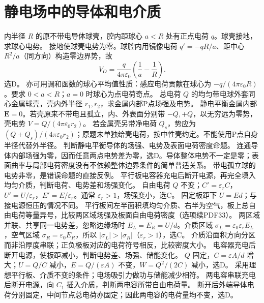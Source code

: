 \section{静电场中的导体和电介质}
\problemtext 内半径 $R$ 的原不带电导体球壳，腔内距球心 $a<R$ 处有正点电荷 $q$。球壳接地，求球心电势。
\workings 接地使球壳电势为零。球腔内用镜像电荷 $q'=-qR/a$、距中心 $R^2/a$（同方向）构造零边界势，故
\[
V_O=\frac{q}{4\pi\varepsilon_0}\left(\frac1a-\frac1R\right).
\]
选D。
\crosscheck 亦可用调和函数的球心平均值性质：感应电荷贡献在球心为 $-q/(4\pi\varepsilon_0R)$。要求 $0<a<R$；$a=0$ 时球心为点电荷奇点。
\problemtext 总电荷 $Q$ 的均匀带电球外套同心金属球壳，壳内外半径 $r_1,r_2$，求金属内部P点场强及电势。
\workings 静电平衡金属内部 $\bm E=0$。若壳原来不带电且孤立，内、外表面分别带 $-Q,+Q$，以无穷远为零势，壳电势 $V=Q/(4\pi\varepsilon_0r_2)$。
\crosscheck 若金属壳另带净电荷 $Q_s$，势应为 $(Q+Q_s)/(4\pi\varepsilon_0r_2)$；原题未单独给壳电荷，按中性壳约定。不能使用P点自身半径代替外半径。
\problemtext 判断静电平衡导体的场强、电势及表面电荷密度命题。
\workings 连通导体内部场强为零，因而任意两点电势差为零，选D。导体整体电势不一定是零；表面曲率与局部电荷密度没有不依赖整体边界条件的简单普适关系。
\crosscheck 带电孤立球的电势非零，是错误命题的直接反例。
\problemtext 平行板电容器充电后断开电源，再完全填入均匀介质，判断电荷、电势差和场强变化。
\workings 自由电荷 $Q$ 不变；$C'=\varepsilon_r C$，$U'=U/\varepsilon_r$，$E'=E/\varepsilon_r$。通常 $\varepsilon_r>1$，场强变小，选C。
\crosscheck 固定板距下 $U=Ed$；与接电源恒压的情况不同。
\problemtext 平行板间左半面积填均匀介质、右半为空气，板上总自由电荷等量异号，比较两区域场强及板面自由电荷密度（选项续PDF33）。
\workings 两区域并联、共享同一电势差，忽略边缘场时 $E_L=E_R=U/d$。介质区域 $\sigma_L=\varepsilon_0\varepsilon_r E_L$，空气区域 $\sigma_R=\varepsilon_0 E_R$，所以 $|\sigma_L|>|\sigma_R|$（$\varepsilon_r>1$），选C。
\crosscheck 介质沿面积方向分区而非沿厚度串联；正负极板对应的电荷符号相反，比较密度大小。
\problemtext 电容器充电后断开电源，使板距减小，判断电势差、场强、储能变化。
\workings $Q$ 固定，$C=\varepsilon A/d$ 增大；$U=Q/C$ 减小，$E=Q/(\varepsilon A)$ 不变，$W=Q^2/(2C)$ 减小，选D。
\crosscheck 采用理想平行板、介质不变的条件；电场吸引力做功与储能减少相符。
\problemtext 两电容串联充电后断开电源，向 $C_1$ 插入介质，判断两电容所带自由电荷量。
\workings 断开后外端导体电荷分别固定，中间节点总电荷亦固定；因此两电容的电荷量均不变，选D。
